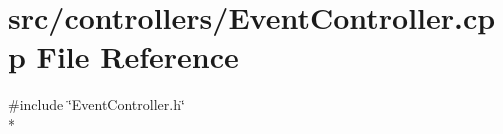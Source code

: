 \section{src/controllers/\-Event\-Controller.cpp File Reference}
\label{_event_controller_8cpp}
{\ttfamily \#include \char`\"{}Event\-Controller.\-h\char`\"{}}\\*
